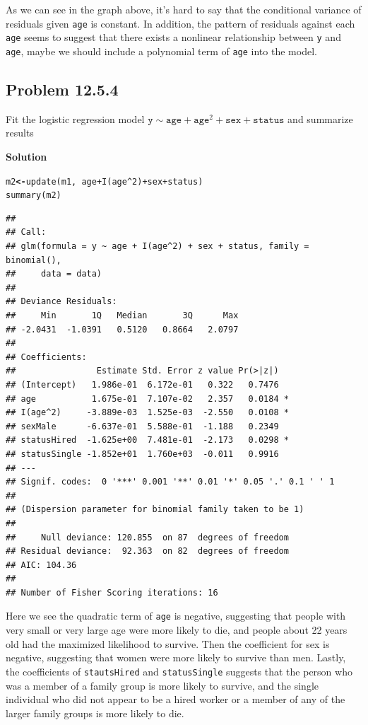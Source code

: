 \documentclass[12pt,oneside,a4paper]{article}\usepackage[]{graphicx}\usepackage[]{xcolor}
\makeatletter
\newcommand{\hlnum}[1]{\textcolor[rgb]{0,0,0}{#1}}%
\newcommand{\hlopt}[1]{\textcolor[rgb]{0,0,0}{#1}}%
\newcommand{\hlstd}[1]{\textcolor[rgb]{0,0,0}{#1}}%
\newcommand{\hlkwb}[1]{\textcolor[rgb]{0.498,0,0.333}{\textbf{#1}}}%
\newcommand{\hlkwd}[1]{\textcolor[rgb]{0,0,0}{#1}}%
\newenvironment{kframe}{%
 \def\at@end@of@kframe{}%
 \ifinner\ifhmode%
  \def\at@end@of@kframe{\end{minipage}}%
  \begin{minipage}{\columnwidth}%
 \fi\fi%
 \def\FrameCommand##1{\hskip\@totalleftmargin \hskip-\fboxsep
 \colorbox{shadecolor}{##1}\hskip-\fboxsep
     \hskip-\linewidth \hskip-\@totalleftmargin \hskip\columnwidth}%
 \MakeFramed {\advance\hsize-\width
   \@totalleftmargin\z@ \linewidth\hsize
   \@setminipage}}%
 {\par\unskip\endMakeFramed%
 \at@end@of@kframe}
\newenvironment{knitrout}{}{} %
\newcommand{\subproblem}[1]
{
    \subsection*{Problem {#1}}
}
\newcommand{\solution}
{
    \vspace{15pt}
    \noindent\ignorespaces\textbf{\large Solution}\par
}
\newcommand{\m}[1]{\texttt{{#1}}}
\makeatother
\begin{document}
As we can see in the graph above, it's hard to say that the conditional variance of residuals given \m{age} is constant. In addition, the pattern of residuals against each \m{age} seems to suggest that there exists a nonlinear relationship between \m{y} and \m{age}, maybe we should include a polynomial term of \m{age} into the model.

\subproblem{12.5.4}
Fit the logistic regression model $\m{y} \sim \m{age} + \m{age} ^ 2 + \m{sex} + \m{status}$ and summarize results

\solution
\begin{knitrout}
\color{fgcolor}\begin{kframe}
\begin{alltt}
\hlstd{m2} \hlkwb{<-} \hlkwd{update}\hlstd{(m1,} \hlopt{~} \hlstd{age} \hlopt{+} \hlkwd{I}\hlstd{(age}\hlopt{^}\hlnum{2}\hlstd{)} \hlopt{+} \hlstd{sex} \hlopt{+} \hlstd{status)}
\hlkwd{summary}\hlstd{(m2)}
\end{alltt}
\begin{verbatim}
## 
## Call:
## glm(formula = y ~ age + I(age^2) + sex + status, family = binomial(), 
##     data = data)
## 
## Deviance Residuals: 
##     Min       1Q   Median       3Q      Max  
## -2.0431  -1.0391   0.5120   0.8664   2.0797  
## 
## Coefficients:
##                Estimate Std. Error z value Pr(>|z|)  
## (Intercept)   1.986e-01  6.172e-01   0.322   0.7476  
## age           1.675e-01  7.107e-02   2.357   0.0184 *
## I(age^2)     -3.889e-03  1.525e-03  -2.550   0.0108 *
## sexMale      -6.637e-01  5.588e-01  -1.188   0.2349  
## statusHired  -1.625e+00  7.481e-01  -2.173   0.0298 *
## statusSingle -1.852e+01  1.760e+03  -0.011   0.9916  
## ---
## Signif. codes:  0 '***' 0.001 '**' 0.01 '*' 0.05 '.' 0.1 ' ' 1
## 
## (Dispersion parameter for binomial family taken to be 1)
## 
##     Null deviance: 120.855  on 87  degrees of freedom
## Residual deviance:  92.363  on 82  degrees of freedom
## AIC: 104.36
## 
## Number of Fisher Scoring iterations: 16
\end{verbatim}
\end{kframe}
\end{knitrout}

Here we see the quadratic term of \m{age} is negative, suggesting that people with very small or very large age were more likely to die, and people about 22 years old had the maximized likelihood to survive. Then the coefficient for sex is negative, suggesting that women were more likely to survive than men. Lastly, the coefficients of \m{stautsHired} and \m{statusSingle} suggests that the person who was a member of a family group is more likely to survive, and the single individual who did not appear to be a hired worker or a member of any of the larger family groups is more likely to die.
\end{document}
